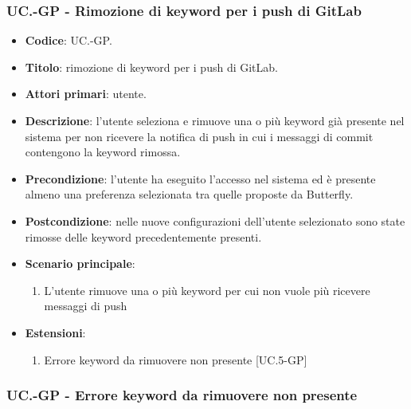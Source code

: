 	\subsubsection{UC\theuccount.\thesubuccount-GP - Rimozione di keyword per i push di GitLab}
	\begin{itemize}
		\item \textbf{Codice}: UC\theuccount.\thesubuccount-GP.
		\item \textbf{Titolo}: rimozione di keyword per i push di GitLab.
		\item \textbf{Attori primari}: utente.
		\item \textbf{Descrizione}: l’utente seleziona e rimuove una o più keyword già presente nel sistema per non ricevere la notifica di push in cui i messaggi di commit contengono la keyword rimossa.
		\item \textbf{Precondizione}: l’utente ha eseguito l'accesso nel sistema ed è presente almeno
        una preferenza selezionata tra quelle proposte da Butterfly.
		\item \textbf{Postcondizione}: nelle nuove configurazioni dell'utente selezionato sono state rimosse delle keyword precedentemente presenti.
		\item \textbf{Scenario principale}:
		\begin{enumerate}
			\item L'utente rimuove una o più keyword per cui non vuole più ricevere messaggi di push
		\end{enumerate}
		\item \textbf{Estensioni}:
		\begin{enumerate}
			\item Errore keyword da rimuovere non presente [UC\theuccount.5-GP]
		\end{enumerate}
	\end{itemize}

	\subsubsection{UC\theuccount.\thesubuccount-GP - Errore keyword da rimuovere non presente}

